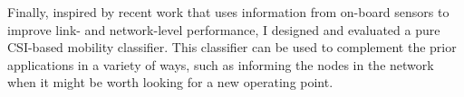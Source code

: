 Finally, inspired by recent work that uses information from on-board sensors to improve link- and network-level performance, I designed and evaluated a pure CSI-based mobility classifier. This classifier can be used to complement the prior applications in a variety of ways, such as informing the nodes in the network when it might be worth looking for a new operating point.


\ifx\mainfile\undefined

\fi